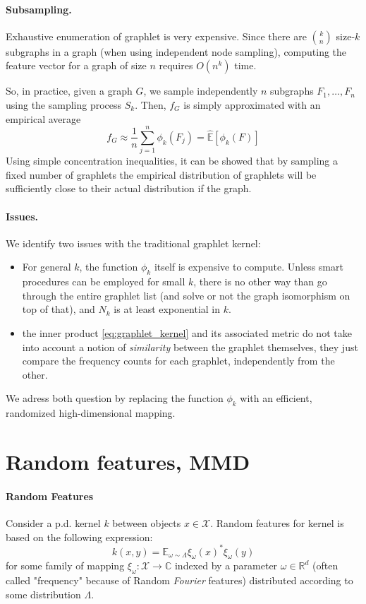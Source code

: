 \documentclass{article}
\begin{document}
\paragraph{Subsampling.} Exhaustive enumeration of graphlet is very expensive. Since there are $\binom{k}{n}$ size-$k$ subgraphs in a graph (when using independent node sampling), computing the feature vector for a graph of size $n$ requires $O(n^k)$ time.

So, in practice, given a graph $G$, we sample independently $n$ subgraphs $F_1, \ldots, F_n$ using the sampling process $S_k$. Then, $f_G$ is simply approximated with an empirical average
\begin{equation}\label{eq:graphlet_kernel_approx}
f_G \approx \frac{1}{n} \sum_{j=1}^n \phi_k(F_j) = \hat{\mathbb{E}}[\phi_k(F)]
\end{equation}
Using simple concentration inequalities, it can be showed \cite{Weissman} that by sampling a fixed number of graphlets the empirical distribution of graphlets will be sufficiently close to their actual distribution if the graph.

\paragraph{Issues.} We identify two issues with the traditional graphlet kernel:
\begin{itemize}
\item For general $k$, the function $\phi_k$ itself is expensive to compute. Unless smart procedures can be employed for small $k$, there is no other way than go through the entire graphlet list (and solve or not the graph isomorphism on top of that), and $N_k$ is at least exponential in $k$.
\item the inner product \eqref{eq:graphlet_kernel} and its associated metric do not take into account a notion of \emph{similarity} between the graphlet themselves, they just compare the frequency counts for each graphlet, independently from the other.
\end{itemize}
We adress both question by replacing the function $\phi_k$ with an efficient, randomized high-dimensional mapping.

\section{Random features, MMD}

\paragraph{Random Features} Consider a p.d. kernel $k$ between objects $x \in\mathcal{X}$. Random features for kernel is based on the following expression:
\begin{equation}\label{eq:RF}
k(x,y) = \mathbb{E}_{\omega \sim \Lambda} \xi_\omega(x)^* \xi_\omega(y)
\end{equation}
for some family of mapping $\xi_\omega:\mathcal{X} \to \mathbb{C}$ indexed by a parameter $\omega \in \mathbb{R}^d$ (often called "frequency" because of Random \emph{Fourier} features) distributed according to some distribution $\Lambda$.
\end{document}

